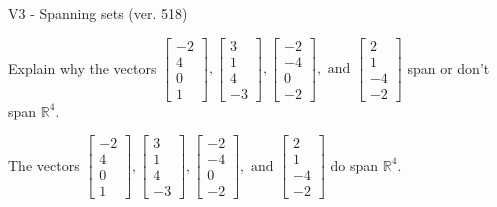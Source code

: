 \begin{exercise}
  \begin{exerciseTitle}V3 - Spanning sets (ver. 518)\end{exerciseTitle}
  \begin{exerciseStatement}
    Explain why the vectors \(\left[\begin{array}{r}
-2 \\
4 \\
0 \\
1
\end{array}\right] , \left[\begin{array}{r}
3 \\
1 \\
4 \\
-3
\end{array}\right] , \left[\begin{array}{r}
-2 \\
-4 \\
0 \\
-2
\end{array}\right] , \text{ and } \left[\begin{array}{r}
2 \\
1 \\
-4 \\
-2
\end{array}\right]\) span or don't span \(\mathbb{R}^4\). 
	


  \end{exerciseStatement}
  \begin{exerciseAnswer}
   The vectors \(\left[\begin{array}{r}
-2 \\
4 \\
0 \\
1
\end{array}\right] , \left[\begin{array}{r}
3 \\
1 \\
4 \\
-3
\end{array}\right] , \left[\begin{array}{r}
-2 \\
-4 \\
0 \\
-2
\end{array}\right] , \text{ and } \left[\begin{array}{r}
2 \\
1 \\
-4 \\
-2
\end{array}\right]\) 
  	 do  
	span \(\mathbb{R}^4\).
  


  \end{exerciseAnswer}
\end{exercise}